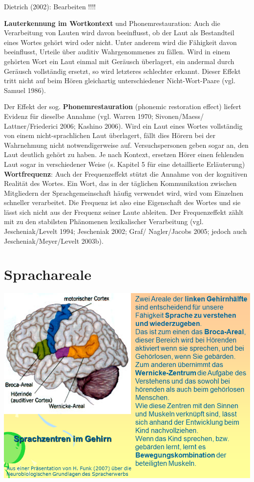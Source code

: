 \documentclass[
  letterpaper,
]{scrbook}
\begin{document}
Dietrich (2002): Bearbeiten !!!!

\textbf{Lauterkennung im Wortkontext} und Phonemrestauration: Auch die
Verarbeitung von Lauten wird davon beeinflusst, ob der Laut als
Bestandteil eines Wortes gehört wird oder nicht. Unter anderem wird die
Fähigkeit davon beeinflusst, Urteile über auditiv Wahrgenommenes zu
fällen. Wird in einem gehörten Wort ein Laut einmal mit Geräusch
überlagert, ein andermal durch Geräusch vollständig ersetzt, so wird
letzteres schlechter erkannt. Dieser Effekt tritt nicht auf beim Hören
gleichartig unterschiedener Nicht-Wort-Paare (vgl. Samuel 1986).

Der Effekt der sog. \textbf{Phonemrestauration} (phonemic restoration
effect) liefert Evidenz für dieselbe Annahme (vgl. Warren 1970;
Sivonen/Maess/ Lattner/Friederici 2006; Kashino 2006). Wird ein Laut
eines Wortes vollständig von einem nicht-sprachlichen Laut überlagert,
fällt dies Hörern bei der Wahrnehmung nicht notwendigerweise auf.
Versuchspersonen geben sogar an, den Laut deutlich gehört zu haben. Je
nach Kontext, ersetzen Hörer einen fehlenden Laut sogar in verschiedener
Weise (s. Kapitel 5 für eine detaillierte Erläuterung)\\

\textbf{Wortfrequenz}: Auch der Frequenzeffekt stützt die Annahme von
der kognitiven Realität des Wortes. Ein Wort, das in der täglichen
Kommunikation zwischen Mitgliedern der Sprachgemeinschaft häufig
verwendet wird, wird vom Einzelnen schneller verarbeitet. Die Frequenz
ist also eine Eigenschaft des Wortes und sie lässt sich nicht aus der
Frequenz seiner Laute ableiten. Der Frequenzeffekt zählt mit zu den
stabilsten Phänomenen lexikalischer Verarbeitung (vgl. Jescheniak/Levelt
1994; Jescheniak 2002; Graf/ Nagler/Jacobs 2005; jedoch auch
Jescheniak/Meyer/Levelt 2003b).\\

\hfill\break

\hypertarget{sprachareale}{%
\section{Sprachareale}\label{sprachareale}}

\includegraphics[width=1\textwidth,height=\textheight]{./pictures/neuro/Diapozitiv35.PNG}
\end{document}

